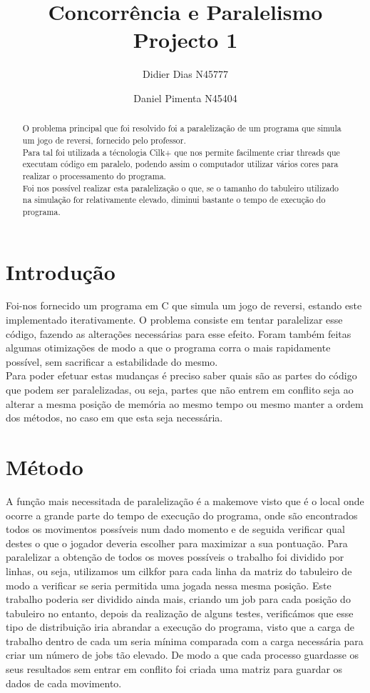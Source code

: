 \documentclass[a4paper]{article}
\title{Concorrência e Paralelismo \\
    \large Projecto 1}
\author{Didier Dias N45777\and Daniel Pimenta N45404}
\begin{document}
    \maketitle
    
    \begin{abstract}
    O problema principal que foi resolvido foi a paralelização de um programa que simula um jogo de reversi, fornecido pelo professor. \\
    Para tal foi utilizada a técnologia Cilk+ que nos permite facilmente criar threads que executam código em paralelo, podendo assim o computador utilizar vários cores para realizar o processamento do programa.\\
    Foi nos possível realizar esta paralelização o que, se o tamanho do tabuleiro utilizado na simulação for relativamente elevado, diminui bastante o tempo de execução do programa.
    \end{abstract}
    
    \section{Introdução}
    
    
    Foi-nos fornecido um programa em C que simula um jogo de reversi, estando este implementado iterativamente. O problema consiste em tentar paralelizar esse código, fazendo as alterações necessárias para esse efeito. Foram também feitas algumas otimizações de modo a que o programa corra o mais rapidamente possível, sem sacrificar a estabilidade do mesmo.\\
    Para poder efetuar estas mudanças é preciso saber quais são as partes do código que podem ser paralelizadas, ou seja, partes que não entrem em conflito seja ao alterar a mesma posição de memória ao mesmo tempo ou mesmo manter a ordem dos métodos, no caso em que esta seja necessária.
    
    \section{Método}
    A função mais necessitada de paralelização é a make\textunderscore move visto que é o local onde ocorre a grande parte do tempo de execução do programa, onde são encontrados todos os movimentos possíveis num dado momento e de seguida verificar qual destes o que o jogador deveria escolher para maximizar a sua pontuação. Para paralelizar a obtenção de todos os moves possíveis o trabalho foi dividido por linhas, ou seja, utilizamos um cilk\textunderscore for para cada linha da matriz do tabuleiro de modo a verificar se seria permitida uma jogada nessa mesma posição. Este trabalho poderia ser dividido ainda mais, criando um job para cada posição do tabuleiro no entanto, depois da realização de alguns testes, verificámos que esse tipo de distribuição iria abrandar a execução do programa, visto que a carga de trabalho dentro de cada um seria mínima comparada com a carga necessária para criar um número de jobs tão elevado.
    De modo a que cada processo guardasse os seus resultados sem entrar em conflito foi criada uma matriz para guardar os dados de cada movimento.
    
\end{document}
